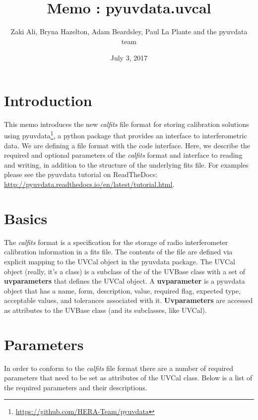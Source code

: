 \documentclass[11pt, oneside]{article}   	%
\title{Memo : pyuvdata.uvcal}
\author{Zaki Ali, Bryna Hazelton, Adam Beardsley, Paul La Plante and the pyuvdata team}
\date{July 3, 2017}							%
\begin{document}
\maketitle
\section{Introduction}
This memo introduces the new \textit{calfits} file format for storing
calibration solutions using
pyuvdata\footnote{\url{https://github.com/HERA-Team/pyuvdata}}, a python package that
provides an interface to interferometric data. We are defining a file format
with the code interface. Here, we describe the required and optional parameters
of the \textit{calfits} format and interface to reading and writing, in addition
to the structure of the underlying fits file. For examples please see the
pyuvdata tutorial on ReadTheDocs: \url{http://pyuvdata.readthedocs.io/en/latest/tutorial.html}.

\section{Basics}

The \textit{calfits} format is a specification for the storage of radio
interferometer calibration information in a fits file.  The contents of the file
are defined via explicit mapping to the UVCal object in the pyuvdata package.
The UVCal object (really, it's a class) is a subclass of the of the UVBase class
with a set of \textbf{uvparameters} that defines the UVCal object. A
\textbf{uvparameter} is a pyuvdata object that has a name, form, description,
value, required flag, expected type, acceptable values, and tolerances
associated with it.  \textbf{Uvparameters} are accessed as attributes to the
UVBase class (and its subclasses, like UVCal).

\section{Parameters}
In order to conform to the \textit{calfits} file format there are a number of
required parameters that need to be set as attributes of the UVCal class. Below
is a list of the required parameters and their descriptions.
\end{document}
